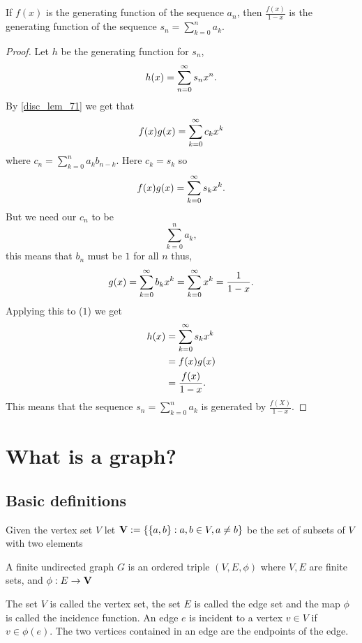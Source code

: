 \documentclass[10pt, a4paper]{article}
\begin{document}
\begin{theorem}
    If $f(x)$ is the generating function of the sequence $a_n$,
    then $\frac{f(x)}{1 - x}$ is the generating function of the sequence $s_n = \sum_{k = 0}^{n}a_k$.
    \begin{proof}
        Let $h$ be the generating function for $s_n$,
        \[
        h(x) = \infsum[n = 0]s_nx ^ n.
        \]
        By \autoref{disc_lem_71} we get that
        \[
        f(x)g(x) = \infsum[k = 0]c_kx ^ k
        \]
        where $c_n = \sum_{k = 0}^{n}a_{k}b_{n - k}$.
        Here $c_k = s_k$ so
        \begin{equation}
            f(x)g(x) = \infsum[k = 0]s_kx ^ k.
        \end{equation}
        But we need our $c_n$ to be
        \[
        \sum_{k = 0}^{n}a_k,
        \]
        this means that $b_n$ must be $1$ for all $n$ thus,
        \[
        g(x) = \infsum[k = 0]b_kx ^ k = \infsum[k = 0]x ^ k = \frac{1}{1 - x}.
        \]
        Applying this to ($1$) we get
        \begin{align*}
            h(x) &= \infsum[k = 0]s_kx ^ k \\
            &= f(x)g(x) \\
            &= \frac{f(x)}{1 - x}.
        \end{align*}
        This means that the sequence $s_n = \sum_{k = 0}^{n}a_k$ is generated by $\frac{f(X)}{1 - x}$.
    \end{proof}
\end{theorem}

\newpage

\section{What is a graph?}

\subsection{Basic definitions}

Given the vertex set $V$ let $\mbf{V} := \{\{a, b\} : a, b \in V, a \neq b\}$ be the set of subsets of $V$ with two elements
\begin{definition}
    A finite undirected graph $G$ is an ordered triple $(V, E, \phi)$ where $V, E$ are finite sets,
    and $\phi : E \rightarrow \mbf{V}$
\end{definition}

The set $V$ is called the vertex set,
the set $E$ is called the edge set and the map $\phi$ is called the incidence function.
An edge $e$ is incident to a vertex $v \in V$ if $v \in \phi(e)$.
The two vertices contained in an edge are the endpoints of the edge.
\end{document}
